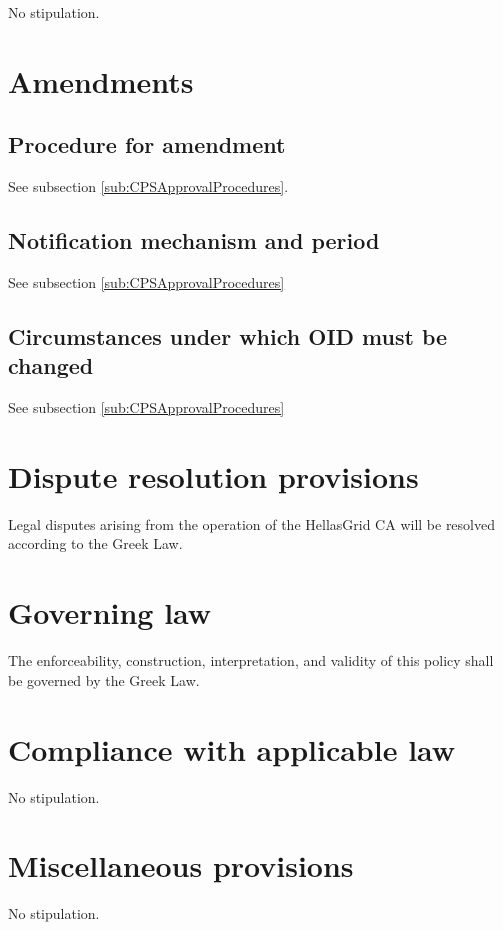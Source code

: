 No stipulation.

\section{Amendments}


\subsection{Procedure for amendment}

See subsection \ref{sub:CPSApprovalProcedures}.

\subsection{Notification mechanism and period}

See subsection \ref{sub:CPSApprovalProcedures}

\subsection{Circumstances under which OID must be changed}

See subsection \ref{sub:CPSApprovalProcedures}

\section{Dispute resolution provisions}

Legal disputes arising from the operation of the HellasGrid CA will be resolved according to the Greek Law.

\section{Governing law}

The enforceability, construction, interpretation, and validity of this policy shall be governed by the Greek Law.


\section{Compliance with applicable law}

No stipulation.

\section{Miscellaneous provisions}

No stipulation.

